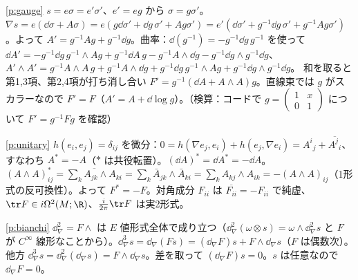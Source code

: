 \begin{sol}{\ref{p:gauge}}
$s=e\sigma=e'\sigma'$、$e'=eg$ から $\sigma=g\sigma'$。$\nabla s=e(\dd\sigma+A\sigma)=e(g\dd\sigma'+\dd g\,\sigma'+Ag\sigma')=e'(\dd\sigma'+g^{-1}\dd g\,\sigma'+g^{-1}Ag\sigma')$。よって $A'=g^{-1}Ag+g^{-1}\dd g$。曲率：$\dd(g^{-1})=-g^{-1}\dd g\,g^{-1}$ を使って
$\dd A'=-g^{-1}\dd g\,g^{-1}\wedge Ag+g^{-1}\dd A\,g-g^{-1}A\wedge\dd g-g^{-1}\dd g\wedge g^{-1}\dd g$、
$A'\wedge A'=g^{-1}A\wedge A\,g+g^{-1}A\wedge\dd g+g^{-1}\dd g\,g^{-1}\wedge Ag+g^{-1}\dd g\wedge g^{-1}\dd g$。
和を取ると第1,3項、第2,4項が打ち消し合い $F'=g^{-1}(\dd A+A\wedge A)g$。直線束では $g$ がスカラーなので $F'=F$（$A'=A+\dd\log g$）。（検算：コードで $g=\begin{pmatrix}1&x\\0&1\end{pmatrix}$ について $F'=g^{-1}Fg$ を確認）
\end{sol}
\begin{sol}{\ref{p:unitary}}
$h(e_i,e_j)=\delta_{ij}$ を微分：$0=h(\nabla e_j,e_i)+h(e_j,\nabla e_i)=A^i{}_j+\overline{A^j{}_i}$、すなわち $A^*=-A$（$*$ は共役転置）。$(\dd A)^*=\dd A^*=-\dd A$。$(A\wedge A)^*_{ij}=\overline{\sum_kA_{jk}\wedge A_{ki}}=\sum_k\bar A_{jk}\wedge\bar A_{ki}=\sum_kA_{kj}\wedge A_{ik}=-(A\wedge A)_{ij}$（1形式の反可換性）。よって $F^*=-F$。対角成分 $F_{ii}$ は $\overline{F_{ii}}=-F_{ii}$ で純虚、$\tr F\in i\Omega^2(M;\R)$、$\frac i{2\pi}\tr F$ は実2形式。
\end{sol}
\begin{sol}{\ref{p:bianchi}}
$\dd_\nabla^2=F\wedge$ は $E$ 値形式全体で成り立つ（$\dd_\nabla^2(\omega\otimes s)=\omega\wedge\dd_\nabla^2s$ と $F$ が $C^\infty$ 線形なことから）。$\dd_\nabla^3s=\dd_\nabla(Fs)=(\dd_\nabla F)s+F\wedge\dd_\nabla s$（$F$ は偶数次）。他方 $\dd_\nabla^3s=\dd_\nabla^2(\dd_\nabla s)=F\wedge\dd_\nabla s$。差を取って $(\dd_\nabla F)s=0$。$s$ は任意なので $\dd_\nabla F=0$。
\end{sol}

